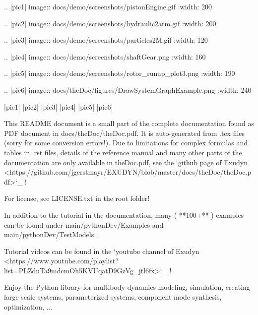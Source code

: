 {.. |pic1| image:: docs/demo/screenshots/pistonEngine.gif
   :width: 200

.. |pic2| image:: docs/demo/screenshots/hydraulic2arm.gif
   :width: 200

.. |pic3| image:: docs/demo/screenshots/particles2M.gif
   :width: 120

.. |pic4| image:: docs/demo/screenshots/shaftGear.png
   :width: 160

.. |pic5| image:: docs/demo/screenshots/rotor_runup_plot3.png
   :width: 190

.. |pic6| image:: docs/theDoc/figures/DrawSystemGraphExample.png
   :width: 240
   
|pic1| |pic2| |pic3| |pic4| |pic5| |pic6|

This README document is a small part of the complete documentation found as PDF document in docs/theDoc/theDoc.pdf.
It is auto-generated from .tex files (sorry for some conversion errors!). 
Due to limitations for complex formulas and tables in .rst files, details of the reference manual and many other parts of the documentation are only available in theDoc.pdf, see the `github page of Exudyn <https://github.com/jgerstmayr/EXUDYN/blob/master/docs/theDoc/theDoc.pdf>`_ !

For license, see LICENSE.txt in the root folder!

In addition to the tutorial in the documentation, many ( **100+** ) examples can be found under main/pythonDev/Examples and main/pythonDev/TestModels .

Tutorial videos can be found in the `youtube channel of Exudyn <https://www.youtube.com/playlist?list=PLZduTa9mdcmOh5KVUqatD9GzVg_jtl6fx>`_ !

Enjoy the Python library for multibody dynamics modeling, simulation, creating large scale systems, parameterized systems, component mode synthesis, optimization, ...
}
%
%


